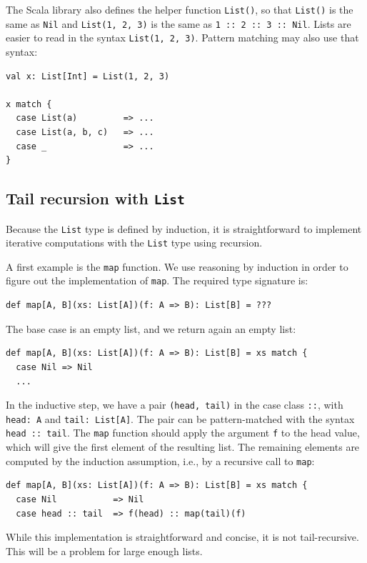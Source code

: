 The Scala library also defines the helper function \lstinline!List()!,
so that \lstinline!List()! is the same as \lstinline!Nil! and \lstinline!List(1, 2, 3)!
is the same as \lstinline!1 :: 2 :: 3 :: Nil!. Lists are easier to
read in the syntax \lstinline!List(1, 2, 3)!. Pattern matching may
also use that syntax:
\begin{lstlisting}
val x: List[Int] = List(1, 2, 3)

x match {
  case List(a)         => ...
  case List(a, b, c)   => ...
  case _               => ...
}
\end{lstlisting}


\subsection{Tail recursion with \texttt{List}\label{subsec:Tail-recursion-with-list}}

Because the \lstinline!List! type is defined by induction, it is
straightforward to implement iterative computations with the \lstinline!List!
type using recursion.

A first example is the \lstinline!map! function. We use reasoning
by induction in order to figure out the implementation of \lstinline!map!.
The required type signature is:
\begin{lstlisting}
def map[A, B](xs: List[A])(f: A => B): List[B] = ???
\end{lstlisting}
The base case is an empty list, and we return again an empty list:
\begin{lstlisting}
def map[A, B](xs: List[A])(f: A => B): List[B] = xs match {
  case Nil => Nil
  ...
\end{lstlisting}
In the inductive step, we have a pair \lstinline!(head, tail)! in
the case class \lstinline!::!, with \lstinline!head: A! and \lstinline!tail: List[A]!.
The pair can be pattern-matched with the syntax \lstinline!head :: tail!.
The \lstinline!map! function should apply the argument \lstinline!f!
to the head value, which will give the first element of the resulting
list. The remaining elements are computed by the induction assumption,
i.e., by a recursive call to \lstinline!map!:
\begin{lstlisting}
def map[A, B](xs: List[A])(f: A => B): List[B] = xs match {
  case Nil           => Nil
  case head :: tail  => f(head) :: map(tail)(f)
\end{lstlisting}
While this implementation is straightforward and concise, it is not
tail-recursive. This will be a problem for large enough lists.

